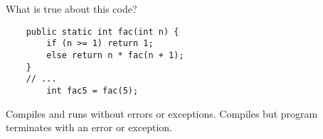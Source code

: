 \documentclass[addpoints,9pt]{exam}
\begin{document}
\begin{questions}

\newpage

\question[3] What is true about this code?

\begin{lstlisting}
    public static int fac(int n) {
        if (n >= 1) return 1;
        else return n * fac(n + 1);
    }
    // ...
        int fac5 = fac(5);
\end{lstlisting}

\begin{choices}
\correctchoice Compiles and runs without errors or exceptions.
\choice Compiles but program terminates with an error or exception.
\end{choices}






\end{questions}
\end{document}
